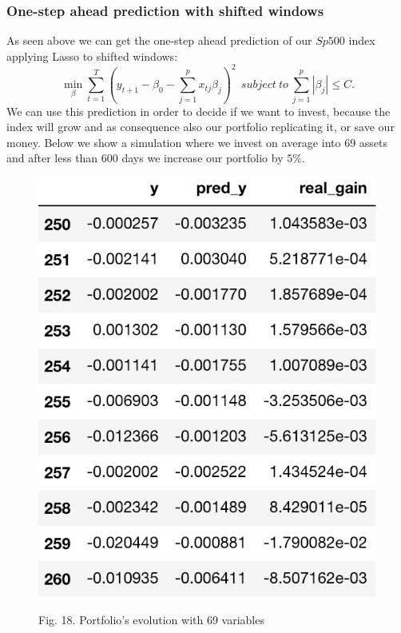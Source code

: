 \documentclass{article}%
\begin{document}
\subsubsection{One-step ahead prediction with shifted windows}
As seen above we can get the one-step ahead prediction of our $Sp500$ index applying Lasso to shifted windows:
\begin{equation}
 \min_{\beta} \sum_{t=1}^T ( y_{t+1} -\beta_0 -\sum_{j=1}^p x_{tj} \beta_j)^2 ~~subject~to~\sum_{j=1}^p |\beta_j| \leq C.
\end{equation}
We can use this prediction in order to decide if we want to invest, because the index will grow and as consequence also our portfolio replicating it, or save our money. Below we show a simulation where we invest on average into 69 assets and after 
less than 600 days we increase our portfolio by $5\%$. 
\newpage
  \begin{figure}[h!!!!!]
  \centering
  \includegraphics[scale=0.6]{act_port.png}
  \begin{center}
\begin{small}
Fig. 18. Portfolio's evolution with 69 variables

\end{small}
\end{center}
  
  \label{portfolio_alpha}
  \end{figure}
  
\end{document}
